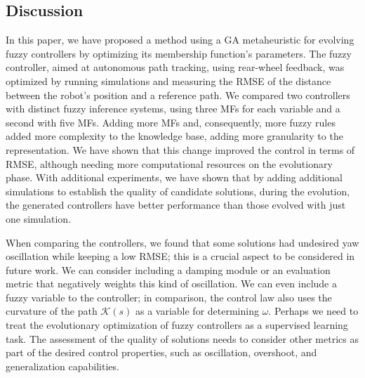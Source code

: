 \documentclass[symmetry,article,submit,moreauthors,pdftex]{Definitions/mdpi}
\begin{document}
\begin{paracol}{2}
\linenumbers
\switchcolumn









\section{Discussion}\label{Discussion}

In this paper, we have proposed a method using a GA metaheuristic for evolving
fuzzy controllers by optimizing its membership function's parameters.  The
fuzzy controller, aimed at autonomous path tracking, using rear-wheel feedback,
was optimized by running simulations and measuring the RMSE of the distance
between the robot's position and a reference path. We compared two controllers
with distinct fuzzy inference systems, using three MFs for each variable and a
second with five MFs. Adding more MFs and, consequently, more fuzzy rules added
more complexity to the knowledge base, adding more granularity to the
representation.  We have shown that this change improved the control in terms
of RMSE, although needing more computational resources on the evolutionary
phase. With additional experiments, we have shown that by adding additional
simulations to establish the quality of candidate solutions, during the
evolution, the generated controllers have better performance than those evolved
with just one simulation.

When comparing the controllers, we found that some solutions had undesired yaw
oscillation while keeping a low RMSE; this is a crucial aspect to be considered
in future work. We can consider including a damping module or an evaluation
metric that negatively weights this kind of oscillation. We can even include a
fuzzy variable to the controller; in comparison, the control law also uses the
curvature of the path $\mathcal{K}(s)$ as a variable for determining $\omega$.
Perhaps we need to treat the evolutionary optimization of fuzzy controllers as
a supervised learning task. The assessment of the quality of solutions needs to
consider other metrics as part of the desired control properties, such as
oscillation, overshoot, and generalization capabilities.

\end{paracol}
\end{document}
